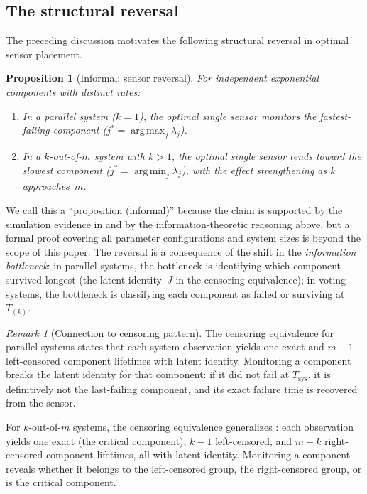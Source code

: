 \documentclass[12pt]{article}
\newtheorem{proposition}[theorem]{Proposition}
\theoremstyle{definition}
\theoremstyle{remark}
\newtheorem{remark}[theorem]{Remark}
\DeclareMathOperator*{\argmax}{arg\,max}
\DeclareMathOperator*{\argmin}{arg\,min}
\begin{document}
\subsection{The structural reversal}
\label{sec:reversal}

The preceding discussion motivates the following structural reversal
in optimal sensor placement.

\begin{proposition}[Informal: sensor reversal]\label{prop:reversal}
  For independent exponential components with distinct rates:
  \begin{enumerate}
    \item[\textup{(a)}] In a parallel system ($k = 1$), the optimal
      single sensor monitors the fastest-failing component
      ($j^* = \argmax_j \lambda_j$).
    \item[\textup{(b)}] In a $k$-out-of-$m$ system with $k > 1$, the
      optimal single sensor tends toward the slowest component
      ($j^* = \argmin_j \lambda_j$), with the effect strengthening as
      $k$ approaches~$m$.
  \end{enumerate}
\end{proposition}

We call this a ``proposition (informal)'' because the claim is
supported by the simulation evidence in  and by
the information-theoretic reasoning above, but a formal proof covering
all parameter configurations and system sizes is beyond the scope of
this paper.  The reversal is a consequence of the shift in the
\emph{information bottleneck}: in parallel systems, the bottleneck is
identifying which component survived longest (the latent identity~$J$
in the censoring equivalence); in voting systems, the bottleneck is
classifying each component as failed or surviving at $T_{(k)}$.

\begin{remark}[Connection to censoring pattern]
The censoring equivalence for parallel systems \citep{Towell2026,
BheringPereiraPolpo2014} states that each system observation yields
one exact and $m - 1$ left-censored component lifetimes with latent
identity.  Monitoring a component breaks the latent identity for that
component: if it did not fail at $T_{\mathrm{sys}}$, it is
definitively not the last-failing component, and its exact failure
time is recovered from the sensor.

For $k$-out-of-$m$ systems, the censoring equivalence generalizes
\citep{CramerNavarro2015}: each observation yields one exact (the
critical component), $k - 1$ left-censored, and $m - k$ right-censored
component lifetimes, all with latent identity.  Monitoring a component
reveals whether it belongs to the left-censored group, the
right-censored group, or is the critical component.
\end{remark}
\end{document}
